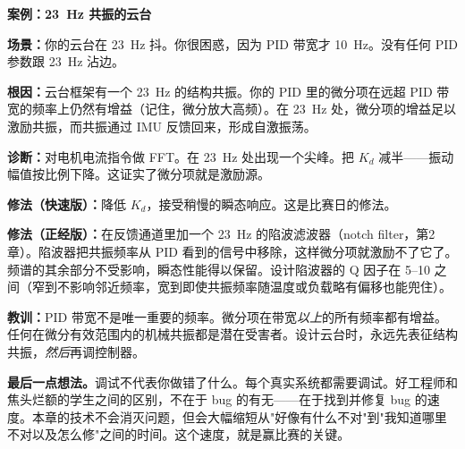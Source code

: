 \vspace{1em}

\begin{mdframed}[linewidth=1pt, innertopmargin=10pt, innerbottommargin=10pt]
\textbf{案例：23~Hz 共振的云台}

\vspace{0.3em}
\textbf{场景：}你的云台在 23~Hz 抖。你很困惑，因为 PID 带宽才 10~Hz。没有任何 PID 参数跟 23~Hz 沾边。

\textbf{根因：}云台框架有一个 23~Hz 的结构共振。你的 PID 里的微分项在远超 PID 带宽的频率上仍然有增益（记住，微分放大高频）。在 23~Hz 处，微分项的增益足以激励共振，而共振通过 IMU 反馈回来，形成自激振荡。

\textbf{诊断：}对电机电流指令做 FFT。在 23~Hz 处出现一个尖峰。把 $K_d$ 减半——振动幅值按比例下降。这证实了微分项就是激励源。

\textbf{修法（快速版）：}降低 $K_d$，接受稍慢的瞬态响应。这是比赛日的修法。

\textbf{修法（正经版）：}在反馈通道里加一个 23~Hz 的陷波滤波器（notch filter，第2章）。陷波器把共振频率从 PID 看到的信号中移除，这样微分项就激励不了它了。频谱的其余部分不受影响，瞬态性能得以保留。设计陷波器的 Q 因子在 5--10 之间（窄到不影响邻近频率，宽到即使共振频率随温度或负载略有偏移也能兜住）。

\textbf{教训：}PID 带宽不是唯一重要的频率。微分项在带宽\textit{以上}的所有频率都有增益。任何在微分有效范围内的机械共振都是潜在受害者。设计云台时，永远先表征结构共振，\textit{然后}再调控制器。
\end{mdframed}

\vspace{1em}

\textbf{最后一点想法。}调试不代表你做错了什么。每个真实系统都需要调试。好工程师和焦头烂额的学生之间的区别，不在于 bug 的有无——在于找到并修复 bug 的速度。本章的技术不会消灭问题，但会大幅缩短从"好像有什么不对"到"我知道哪里不对以及怎么修"之间的时间。这个速度，就是赢比赛的关键。
